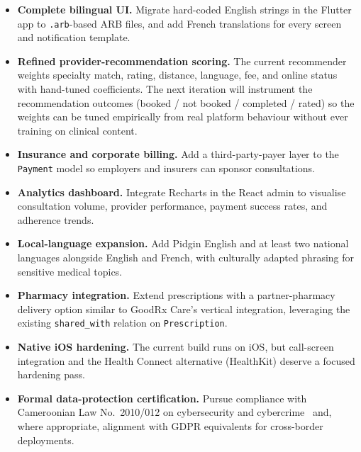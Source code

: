 \begin{itemize}
  \item \textbf{Complete bilingual UI.} Migrate hard-coded English strings in the Flutter app to \texttt{.arb}-based ARB files, and add French translations for every screen and notification template.
  \item \textbf{Refined provider-recommendation scoring.} The current recommender weights specialty match, rating, distance, language, fee, and online status with hand-tuned coefficients. The next iteration will instrument the recommendation outcomes (booked / not booked / completed / rated) so the weights can be tuned empirically from real platform behaviour without ever training on clinical content.
  \item \textbf{Insurance and corporate billing.} Add a third-party-payer layer to the \texttt{Payment} model so employers and insurers can sponsor consultations.
  \item \textbf{Analytics dashboard.} Integrate Recharts in the React admin to visualise consultation volume, provider performance, payment success rates, and adherence trends.
  \item \textbf{Local-language expansion.} Add Pidgin English and at least two national languages alongside English and French, with culturally adapted phrasing for sensitive medical topics.
  \item \textbf{Pharmacy integration.} Extend prescriptions with a partner-pharmacy delivery option similar to GoodRx Care's vertical integration, leveraging the existing \texttt{shared\_with} relation on \texttt{Prescription}.
  \item \textbf{Native iOS hardening.} The current build runs on iOS, but call-screen integration and the Health Connect alternative (HealthKit) deserve a focused hardening pass.
  \item \textbf{Formal data-protection certification.} Pursue compliance with Cameroonian Law No.~2010/012 on cybersecurity and cybercrime~\cite{cameroon_law_2010_012} and, where appropriate, alignment with GDPR equivalents for cross-border deployments.
\end{itemize}
